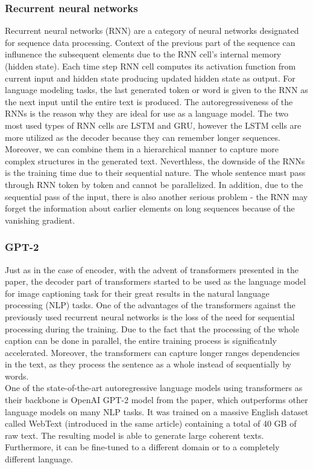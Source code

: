 \subsubsection{Recurrent neural networks}
Recurrent neural networks (RNN)\citep{rumelhart1985learning} are a category of neural networks designated for sequence data processing. Context of the previous part of the sequence can influnence the subsequent elements due to the RNN cell's internal memory (hidden state). Each time step RNN cell computes its activation function from current input and hidden state producing updated hidden state as output. For language modeling tasks, the last generated token or word is given to the RNN as the next input until the entire text is produced. The autoregressiveness of the RNNs is the reason why they are ideal for use as a language model. The two most used types of RNN cells are LSTM\citep{hochreiter1997long} and GRU\citep{cho2014learning}, however the LSTM cells are more utilized as the decoder because they can remember longer sequences. Moreover, we can combine them in a hierarchical manner to capture more complex structures in the generated text. Neverthless, the downside of the RNNs is the training time due to their sequential nature. The whole sentence must pass through RNN token by token and cannot be parallelized. In addition, due to the sequential pass of the input, there is also another serious problem - the RNN may forget the information about earlier  elements on long sequences because of the vanishing gradient.

\subsubsection{GPT-2}
Just as in the case of encoder, with the advent of transformers presented in the \citet{vaswani2017attention} paper, the decoder part of transformers started to be used as the language model for image captioning task for their great results in the natural language processing (NLP) tasks. One of the advantages of the transformers against the previously used recurrent neural networks is the loss of the need for sequential processing during the training. Due to the fact that the processing of the whole caption can be done in parallel, the entire training process is significatnly accelerated. Moreover, the transformers can capture longer ranges dependencies in the text, as they process the sentence as a whole instead of sequentially by words.\\

One of the state-of-the-art autoregressive language models using transformers as their backbone is OpenAI GPT-2 model from the \citet{radford2019language} paper, which outperforms other language models on many NLP tasks. It was trained on a massive English dataset called WebText (introduced in the same article) containing a total of 40 GB of raw text. The resulting model is able to generate large coherent texts. Furthermore, it can be fine-tuned to a different domain or to a completely different language.

